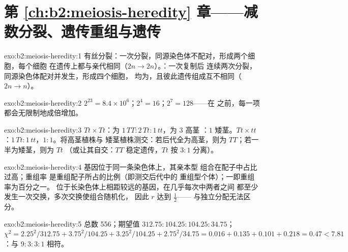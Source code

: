\section*{第 \ref{ch:b2:meiosis-heredity} 章——减数分裂、遗传重组与遗传}

\begin{solution}{exo:b2:meiosis-heredity:1}
有丝分裂：一次分裂，同源染色体不配对，形成两个细胞，每个细胞
在遗传上都与亲代相同（$2n \to 2n$）。：一次复制后
连续两次分裂，同源染色体配对并发生，形成四个细胞，
均为，且彼此遗传组成互不相同（$2n \to n$）。
\end{solution}

\begin{solution}{exo:b2:meiosis-heredity:2}
$2^{23} = 8.4\times 10^{6}$；$2^{4} = 16$；$2^{7} = 128$——在
之前，每一项都会无限制地成倍增加。
\end{solution}

\begin{solution}{exo:b2:meiosis-heredity:3}
$Tt\times Tt$：为 $1\,TT : 2\,Tt : 1\,tt$，为 $3$ 高茎
：$1$ 矮茎。$Tt\times tt$：$1\,Tt : 1\,tt$，$1 : 1$。将高茎植株与
矮茎植株测交：若后代全为高茎，则为 $TT$；若一半为矮茎，则为 $Tt$
（或让其自交：$TT$ 稳定遗传，$Tt$ 按 $3 : 1$ 分离）。
\end{solution}

\begin{solution}{exo:b2:meiosis-heredity:4}
基因位于同一条染色体上，其亲本型
组合在配子中占比过高；重组率
是重组配子所占的比例（即测交后代中的
重组型个体）；一即重组率为百分之一。
位于长染色体上相距较远的基因，在几乎每次中两者之间
都至少发生一次交换，多次交换使组合随机化，
因此 $r$ 达到 $\tfrac12$——
与独立分配无法区分。
\end{solution}

\begin{solution}{exo:b2:meiosis-heredity:5}
总数 556；期望值 $312.75 : 104.25 : 104.25 : 34.75$；$\chi^2 =
2.25^2/312.75 + 3.75^2/104.25 + 3.25^2/104.25 + 2.75^2/34.75 = 0.016
+ 0.135 + 0.101 + 0.218 = 0.47 < 7.81$：与 $9 : 3 : 3 :
1$ 相符。
\end{solution}

